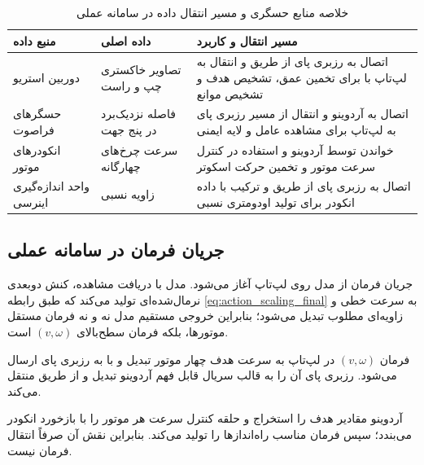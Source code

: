 \begin{table}[htbp]
	\centering
	\caption{خلاصه منابع حسگری و مسیر انتقال داده در سامانه عملی}
	\label{tab:real_sensor_data_paths}
	\begin{tabular}{|p{}|p{}|p{}|}
		\hline
		\textbf{منبع داده} &
		\textbf{داده اصلی} &
		\textbf{مسیر انتقال و کاربرد} \\
		\hline
		دوربین استریو &
		تصاویر خاکستری چپ و راست &
		اتصال به رزبری پای از طریق \lr{CSI} و انتقال به لپ‌تاپ با \lr{GStreamer} برای تخمین عمق، تشخیص هدف و تشخیص موانع \\
		\hline
		
		حسگرهای فراصوت &
		فاصله نزدیک‌برد در پنج جهت &
		اتصال به آردوینو و انتقال از مسیر رزبری پای به لپ‌تاپ برای مشاهده عامل و لایه ایمنی \\
		\hline
		
		انکودرهای موتور &
		سرعت چرخ‌های چهارگانه &
		خواندن توسط آردوینو و استفاده در کنترل سرعت موتور و تخمین حرکت اسکوتر \\
		\hline
		
		واحد اندازه‌گیری اینرسی &
		زاویه نسبی \lr{yaw} &
		اتصال به رزبری پای از طریق \lr{USB} و ترکیب با داده انکودر برای تولید اودومتری نسبی \\
		\hline
		
	\end{tabular}
	
	
\end{table}

\subsection{جریان فرمان در سامانه عملی}
\label{subsec:real_command_flow}

جریان فرمان از مدل  روی لپ‌تاپ آغاز می‌شود. مدل با دریافت مشاهده، کنش دوبعدی نرمال‌شده‌ای تولید می‌کند که طبق رابطه \ref{eq:action_scaling_final} به سرعت خطی و زاویه‌ای مطلوب تبدیل می‌شود؛ بنابراین خروجی مستقیم مدل نه  و نه فرمان مستقل موتورها، بلکه فرمان سطح‌بالای $(v,\omega)$ است.

فرمان $(v,\omega)$ در لپ‌تاپ به سرعت هدف چهار موتور تبدیل و با  به رزبری پای ارسال می‌شود. رزبری پای آن را به قالب سریال قابل فهم آردوینو تبدیل و از طریق  منتقل می‌کند.

آردوینو مقادیر هدف را استخراج و حلقه کنترل سرعت هر موتور را با بازخورد انکودر می‌بندد؛ سپس فرمان مناسب راه‌اندازها را تولید می‌کند. بنابراین نقش آن صرفاً انتقال فرمان نیست.

